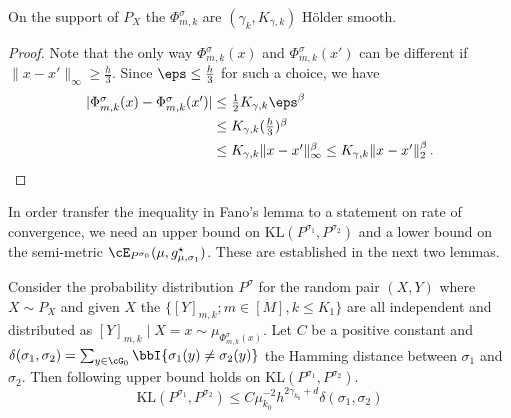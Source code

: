 \begin{lemma}
\label{lem: Holder}
   On the support of $P_X$ the $\Phi_{m, k}^\sigma$ are $(\gamma_{k}, K_{\gamma, k})$ H\"older smooth. 
\end{lemma}
\begin{proof}
 Note that the only way $\Phi_{m, k}^\sigma(x)$ and $\Phi_{m,k}^\sigma(x')$ can be different if $\|x- x'\|_\infty  \ge \frac{h}{3}$. Since $\eps \le \frac h3$ for such a choice, we have 
\[
\begin{aligned}
    \textstyle |\Phi_{m, k}^\sigma(x) - \Phi_{m, k}^\sigma(x') | & \textstyle \le \frac12 K_{\gamma, k} \eps ^\beta\\
    & \textstyle \le  K_{\gamma, k} (\frac h3) ^\beta\\
    & \textstyle \le K_{\gamma, k} \|x - x'\|_\infty ^\beta \le K_{\gamma, k} \|x - x'\|_2^\beta\,.
\end{aligned}
\]
\end{proof}
In order transfer the inequality in Fano's lemma to a statement on rate of convergence, we need an upper bound on $ \text{KL}(P^{\sigma_1}, P^{\sigma_2})$ and a lower bound on the semi-metric $\cE_{P^{\sigma_0}}(\mu, g^\star_{\mu, \sigma_1})$. These are established in the next two lemmas.
\begin{lemma}
   Consider the probability distribution $P^\sigma$ for the random pair $(X, Y)$ where $X \sim P_X$ and given $X$ the $\{[Y]_{m, k}; m \in [M], k \le K_1\}$ are all independent and distributed as $[Y]_{m, k} \mid X = x \sim \mu_{\Phi_{m, k}^{\sigma}(x)}$. Let $C$ be a positive constant and $\delta(\sigma_1, \sigma_2) = \sum_{y \in \cG_0 }   \bbI\{\sigma_1(y) \neq \sigma_2(y) \} $ the Hamming distance between $\sigma_1$ and $\sigma_2$. Then following upper bound holds on $\text{KL}(P^{\sigma_1}, P^{\sigma_2})$. 
   \[ \text{KL}(P^{\sigma_1}, P^{\sigma_2}) \leq C \mu_{k_0}^{-2} h ^{2\gamma_{k_0} + d }\delta(\sigma_1 , \sigma_2)\]
\end{lemma}
